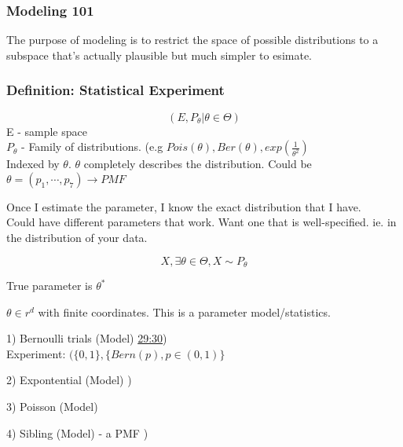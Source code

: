 \subsubsection*{Modeling 101} 


The purpose of modeling is to restrict the space of possible distributions to a subspace that's actually plausible but much simpler to esimate.

\subsubsection*{Definition: Statistical Experiment}


$$
(E, P_{\theta} | \theta \in \Theta)
$$
E - sample space\\
$P_{\theta}$ - Family of distributions. (e.g $Pois(\theta), Ber(\theta), exp(\frac{1}{\theta^2})$\\

Indexed by $\theta$. $\theta$ completely describes the distribution.  Could be $\theta=(p_1, \cdots, p_7) \rightarrow PMF$

 Once I estimate the parameter, I know the exact distribution that I have.\\

 Could have different parameters that work.  Want one that is well-specified. ie. in the distribution of your data.

$$X, \exists \theta \in \Theta, X \sim P_{\theta}$$

True parameter is $\theta^{\ast}$

$\theta \in r^d$ with finite coordinates. This is a parameter model/statistics.


1) Bernoulli trials (Model) \href{https://youtu.be/TSkDZbGS94k?t=28m30s}{29:30})\\

Experiment: $(\{0,1\}, \{Bern(p), p \in (0,1)\}$



2) Expontential (Model) )\\


3) Poisson (Model)


4) Sibling (Model) - a PMF )

